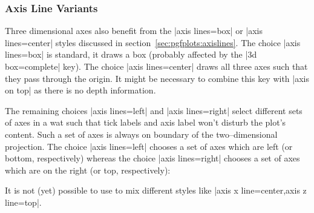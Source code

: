 


\subsubsection{Axis Line Variants}
\label{sec:pgfplots:axislines:3d}
Three dimensional axes also benefit from the |axis lines=box| or |axis lines=center| styles discussed in section~\ref{sec:pgfplots:axislines}. The choice |axis lines=box| is standard, it draws a box (probably affected by the |3d box=complete| key). 
The choice |axis lines=center| draws all three axes such that they pass through the origin. It might be necessary to combine this key with |axis on top| as there is no depth information.

\begin{codeexample}[]
\end{codeexample}

The remaining choices |axis lines=left| and |axis lines=right| select different sets of axes in a wat such that tick labels and axis label won't disturb the plot's content. Such a set of axes is always on boundary of the two--dimensional projection.  The choice |axis lines=left| chooses a set of axes which are left (or bottom, respectively) whereas the choice |axis lines=right| chooses a set of axes which are on the right (or top, respectively):

\begin{codeexample}[]
\end{codeexample}

\begin{codeexample}[]
\end{codeexample}

It is not (yet) possible to use to mix different styles like |axis x line=center,axis z line=top|.

